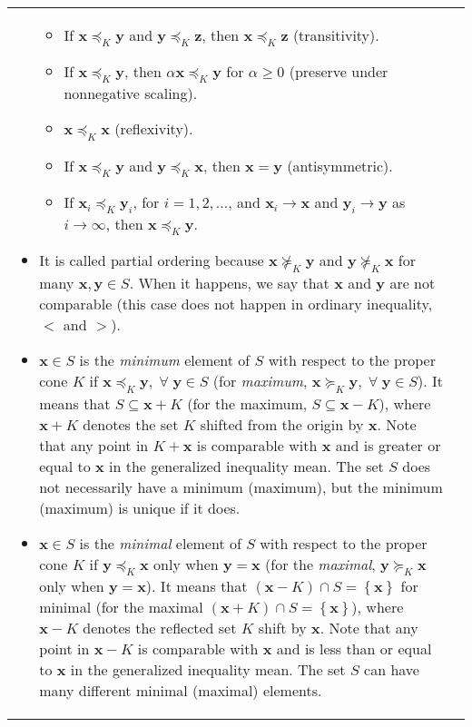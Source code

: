 \documentclass{article}
\begin{document}
\begin{table}[ht!]
\begin{tabularx}{\textwidth}{|A|C|}
\begin{itemize}[leftmargin=*]
\begin{itemize}[label={$\triangleright$}]
            \item If \(\mathbf{x} \preceq_K \mathbf{y}\) and \(\mathbf{y} \preceq_K \mathbf{z}\), then \(\mathbf{x} \preceq_K \mathbf{z}\) (transitivity).
            \item If \(\mathbf{x}\preceq_K \mathbf{y}\), then \(\alpha\mathbf{x}\preceq_K \mathbf{y}\) for \(\alpha\geq0\) (preserve under nonnegative scaling).
            \item \(\mathbf{x}\preceq_K \mathbf{x}\) (reflexivity).
            \item If \(\mathbf{x}\preceq_K \mathbf{y}\) and \(\mathbf{y}\preceq_K \mathbf{x}\), then \(\mathbf{x} = \mathbf{y}\) (antisymmetric).
            \item If \(\mathbf{x}_i\preceq_K \mathbf{y}_i\), for \(i = 1, 2, \dots\), and \(\mathbf{x}_i \rightarrow \mathbf{x}\) and \(\mathbf{y}_i \rightarrow \mathbf{y}\) as \(i \rightarrow \infty\), then \(\mathbf{x} \preceq_K \mathbf{y}\).
        \end{itemize}
    \item It is called partial ordering because \(\mathbf{x} \nsucceq_K \mathbf{y}\) and \(\mathbf{y} \nsucceq_K \mathbf{x}\) for many \(\mathbf{x}, \mathbf{y} \in S\). When it happens, we say that \(\mathbf{x}\) and \(\mathbf{y}\) are not comparable (this case does not happen in ordinary inequality, \(<\) and \(>\)).
    \item \(\mathbf{x} \in S\) is the \emph{minimum} element of \(S\) with respect to the proper cone \(K\) if \(\mathbf{x} \preceq_K \mathbf{y}, \;\forall\;\mathbf{y} \in S\) (for \emph{maximum}, \(\mathbf{x} \succeq_K \mathbf{y}, \;\forall\;\mathbf{y} \in S\)). It means that \(S \subseteq \mathbf{x} + K\) (for the maximum, \(S \subseteq \mathbf{x} - K\)), where \(\mathbf{x} + K\) denotes the set \(K\) shifted from the origin by \(\mathbf{x}\). Note that any point in \(K+\mathbf{x}\) is comparable with \(\mathbf{x}\) and is greater or equal to \(\mathbf{x}\) in the generalized inequality mean. The set \(S\) does not necessarily have a minimum (maximum), but the minimum (maximum) is unique if it does.
    \item \(\mathbf{x} \in S\) is the \emph{minimal} element of \(S\) with respect to the proper cone \(K\) if \(\mathbf{y} \preceq_K \mathbf{x}\) only when \(\mathbf{y} = \mathbf{x}\) (for the \emph{maximal}, \(\mathbf{y} \succeq_K \mathbf{x}\) only when \(\mathbf{y} = \mathbf{x}\)). It means that \((\mathbf{x} - K) \cap S = \left\{ \mathbf{x} \right\}\) for minimal (for the maximal \((\mathbf{x} + K) \cap S = \left\{ \mathbf{x} \right\}\)), where \(\mathbf{x} - K\) denotes the reflected set \(K\) shift by \(\mathbf{x}\). Note that any point in \(\mathbf{x} - K\) is comparable with \(\mathbf{x}\) and is less than or equal to \(\mathbf{x}\) in the generalized inequality mean. The set \(S\) can have many different minimal (maximal) elements.

\end{itemize}
\end{tabularx}
\end{table}
\end{document}

